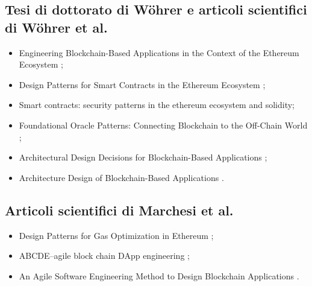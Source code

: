 \subsection*{Tesi di dottorato di Wöhrer e articoli scientifici di Wöhrer et al.}
\begin{itemize}

\item Engineering Blockchain-Based Applications in the Context of the Ethereum Ecosystem \cite{wohrer2022thesis};

\item Design Patterns for Smart Contracts in the Ethereum Ecosystem \cite{wohrer2018designpatterns};

\item Smart contracts: security patterns in the ethereum ecosystem and solidity\cite{wohrer2018securitypatterns};

\item Foundational Oracle Patterns: Connecting Blockchain to the Off-Chain World \cite{wohrer2020oracle};

\item Architectural Design Decisions for Blockchain-Based Applications \cite{wohrer2021decisions};

\item Architecture Design of Blockchain-Based Applications \cite{wohrer2021architecture}.

\end{itemize}

\subsection*{Articoli scientifici di Marchesi et al.}
\begin{itemize}

\item Design Patterns for Gas Optimization in Ethereum \cite{marchesi2020gas};

\item ABCDE--agile block chain DApp engineering \cite{marchesi2020agile};

\item An Agile Software Engineering Method to Design Blockchain Applications \cite{marchesi2018agile}.

\end{itemize}

